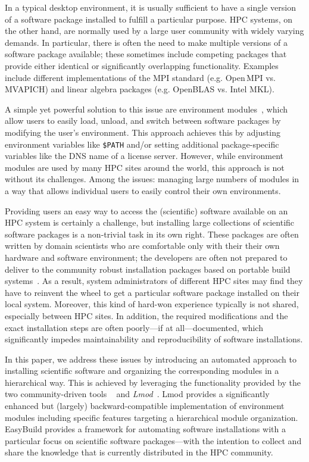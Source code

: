 In a typical desktop environment, it is usually sufficient to have a
single version of a software package installed to fulfill a particular purpose. HPC
systems, on the other hand, are normally used by a large user community with widely varying
demands. In particular, there is often the need to make multiple versions of
a software package available; these sometimes include competing packages
that provide either identical or significantly overlapping functionality. Examples include
 different implementations of the MPI standard (e.g. Open\,MPI vs.
MVAPICH) and linear algebra packages (e.g. OpenBLAS vs. Intel MKL).

A simple yet powerful solution to this issue are environment
modules~\cite{furlani91,furlani96,eadline,laytonEM1}, which allow
users to easily load, unload, and switch between software packages by
modifying the user's environment. This approach achieves this by adjusting environment
variables like \texttt{\small\$PATH} and/or setting additional package-specific
variables like the DNS name of a
license server. However, while environment modules are used by many
HPC sites around the world, this approach is not without its challenges. Among the issues: managing large numbers of modules in a way that allows individual users to easily control their own environments.

Providing users an easy way to access the (scientific) software
available on an HPC system is certainly a challenge, but installing large collections of scientific software packages is a
non-trivial task in its own right. These packages are often written by domain
scientists who are comfortable only with their their own hardware and software environment; the developers are often not prepared to deliver to the community robust installation packages based on portable build
systems~\cite{Dubois03}. As a result, system administrators of different HPC sites may find they have to reinvent the wheel to
get a particular software package installed on their local system. Moreover, this
kind of hard-won experience typically is not shared, especially between HPC sites. In
addition, the required modifications and the exact installation steps are
often poorly---if at all---documented, which significantly impedes
maintainability and reproducibility of software installations.

In this paper, we address these issues by introducing an automated approach to installing scientific
software and organizing the corresponding modules in a hierarchical way. This is achieved by leveraging the functionality provided by the two community-driven tools
\emph{\easybuild{}}~\cite{EasyBuildSC12} and \emph{Lmod}~\cite{taccLmod}.
Lmod provides a significantly enhanced but
(largely) backward-compatible implementation of environment modules including specific
features targeting a hierarchical module organization. EasyBuild provides a
framework for automating software installations with a particular focus on
scientific software packages---with the intention to collect and share the
knowledge that is currently distributed in the HPC community.

